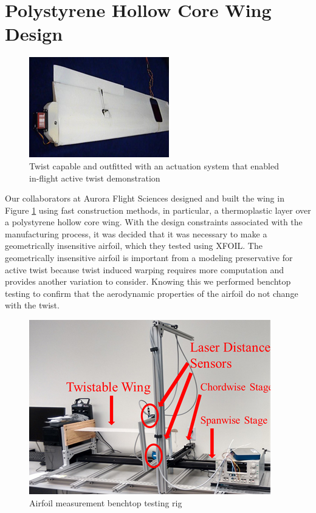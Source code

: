 \documentclass[11pt]{ucthesis}
\begin{document}
\section{Polystyrene Hollow Core Wing Design}

\begin{figure}[thpb]
\centering
\includegraphics[width=0.5\linewidth]{Figures/AuroraWing.png}
\caption{Twist capable and outfitted with an actuation system that enabled in-flight active twist demonstration}
\label{fig:Awing}
\end{figure}

Our collaborators at Aurora Flight Sciences designed and built the wing in Figure \ref{fig:Awing} using fast construction methods, in particular, a thermoplastic layer over a polystyrene hollow core wing. With the design constraints associated with the manufacturing process, it was decided that it was necessary to make a geometrically insensitive airfoil, which they tested using XFOIL. The geometrically insensitive airfoil is important from a modeling preservative for active twist because twist induced warping requires more computation and provides another variation to consider. Knowing this we performed benchtop testing to confirm that the aerodynamic properties of the airfoil do not change with the twist.

\begin{figure}[thpb]
\centering
\includegraphics[width=0.75\linewidth]{Figures/AuroraWingBenchtopTest.png}
\caption{Airfoil measurement benchtop testing rig}
\label{fig:Atestrig}
\end{figure}
\end{document}
